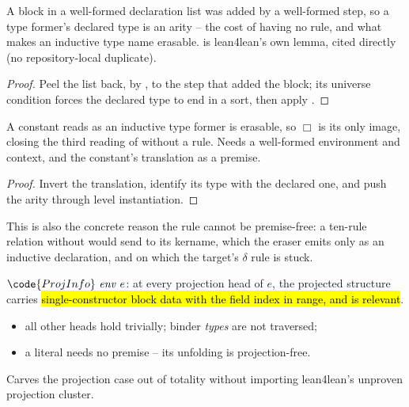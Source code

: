 \begin{lemma}
\label{lem:IndInfo-constant_isArity}
\leanok
{}
 A block in a well-formed declaration list was added by a well-formed step, so a type former's declared type is an arity -- the cost of having no  rule, and what makes an inductive type name erasable.
  is lean4lean's own lemma, cited directly (no repository-local duplicate).
\end{lemma}
\begin{proof}
\leanok
{}
 Peel the list back, by , to the step that added the block; its universe condition forces the declared type to end in a sort, then apply .
\end{proof}

\begin{lemma}
\label{lem:Erases-indInfo_erasable}
\leanok
{}
 A constant  reads as an inductive type former is erasable, so $\Box$ is its only image, closing the third reading of  without a rule.
 Needs a well-formed environment and context, and the constant's translation as a premise.
\end{lemma}
\begin{proof}
\leanok
{}
 Invert the translation, identify its type with the declared one, and push the arity through level instantiation.
\end{proof}

\begin{remark}
 This is also the concrete reason the  rule cannot be premise-free: a ten-rule relation without  would send  to its kername, which the eraser emits only as an inductive declaration, and on which the target's $\delta$ rule is stuck.
\end{remark}

\begin{definition}
\label{def:ProjInfo}
\leanok
{}
 $\code{ProjInfo}\ \mathit{env}\ e$: at every projection head of $e$, the projected structure carries \hl{single-constructor block data with the field index in range, and is relevant}.
\begin{itemize}
\item all other heads hold trivially; binder \emph{types} are not traversed;
\item a literal needs no premise -- its unfolding is projection-free.
\end{itemize}
 Carves the projection case out of totality without importing lean4lean's unproven projection cluster.
\end{definition}

